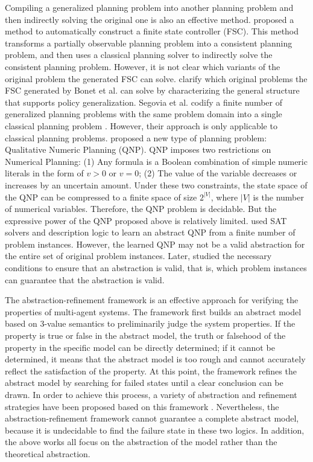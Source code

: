 \documentclass[review]{elsarticle}
\begin{document}
Compiling a generalized planning problem into another planning problem and then indirectly solving the original one is also an effective method.
\citet{BonPG2009} proposed a method to automatically construct a finite state controller (FSC). This method transforms a partially observable planning problem into a consistent planning problem, and then uses a classical planning solver to indirectly solve the consistent planning problem. However, it is not clear which variants of the original problem the generated FSC can solve. \citet{BonG2015} clarify which original problems the FSC generated by Bonet et al. \cite{BonPG2009} can solve by characterizing the general structure that supports policy generalization.
Segovia et al. codify a finite number of generalized planning problems with the same problem domain into a single classical planning problem \cite{SegJJ2016,SegJJ2019,SegJJ2021}. 
However, their approach is only applicable to classical planning problems. \citet{SriZIG2011} proposed a new type of planning problem: Qualitative Numeric Planning (QNP). QNP imposes two restrictions on Numerical Planning:
(1) Any formula is a Boolean combination of simple numeric literals in the form of $v > 0$ or $v = 0$; (2) The value of the variable decreases or increases by an uncertain amount. Under these two constraints, the state space of the QNP can be compressed to a finite space of size $2^{|V|}$, where $|V|$ is the number of numerical variables. Therefore, the QNP problem is decidable. But the expressive power of the QNP proposed above is relatively limited. \citet{BonFG2019} used SAT solvers and description logic to learn an abstract QNP from a finite number of problem instances. However, the learned QNP may not be a valid abstraction for the entire set of original problem instances. Later, \citet{BonFEB2019} studied the necessary conditions to ensure that an abstraction is valid, that is, which problem instances can guarantee that the abstraction is valid.

The abstraction-refinement framework is an effective approach for verifying the properties of multi-agent systems. The framework first builds an abstract model based on 3-value semantics to preliminarily judge the system properties. If the property is true or false in the abstract model, the truth or falsehood of the property in the specific model can be directly determined; if it cannot be determined, it means that the abstract model is too rough and cannot accurately reflect the satisfaction of the property. At this point, the framework refines the abstract model by searching for failed states until a clear conclusion can be drawn. In order to achieve this process, a variety of abstraction and refinement strategies have been proposed based on this framework \cite{lomM2014, lomM2016, BelLM2016, BelFM2023}. Nevertheless, the abstraction-refinement framework cannot guarantee a complete abstract model, because it is undecidable to find the failure state in these two logics. In addition, the above works all focus on the abstraction of the model rather than the theoretical abstraction.
\end{document}
